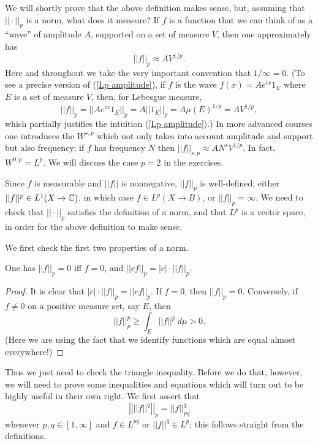 We will shortly prove that the above definition makes sense, but, assuming that $||\cdot||_{p} $ is a norm, what does it measure?
If $f$ is a function that we can think of as a ``wave'' of amplitude $A$, supported on a set of measure $V$, then one approximately has
\begin{equation}
\label{Lp amplitude}
||f||_{p}  \approx AV^{1/p}.
\end{equation}
Here and throughout we take the very important convention that $1/\infty = 0$.
(To see a precise version of (\ref{Lp amplitude}), if $f$ is the wave $f(x) = Ae^{ix}1_E$ where $E$ is a set of measure $V$, then, for Lebesgue measure,
\[||f||_{p}  = ||Ae^{ix}1_E||_{p}  = A ||1_E||_{p}  = A\mu(E)^{1/p} = AV^{1/p},\]
which partially justifies the intuition (\ref{Lp amplitude}).)
In more advanced courses one introduces the  $W^{s,p}$ which not only takes into account amplitude and support but also frequency; if $f$ has frequency $N$ then $||f||_{s,p} \approx AN^sV^{1/p}$.
In fact, $W^{0,p} = L^p$.
We will discuss the case $p = 2$ in the exercises.

Since $f$ is measurable and $||f||$ is nonnegative, $||f||_{p} $ is well-defined; either $||f||^{p} \in L^1(X \to \mathbb{C})$, in which case $f \in L^p(X \to B)$, or $||f||_{p}  = \infty$.
We need to check that $||\cdot||_{p} $ satisfies the definition of a norm, and that $L^p$ is a vector space, in order for the above definition to make sense.

We first check the first two properties of a norm.
\begin{lemma}
One has $||f||_{p}  = 0$ iff $f = 0$, and $||cf||_{p}  = |c|\cdot||f||_{p} $.
\end{lemma}
\begin{proof}
It is clear that $|c|\cdot||f||_{p}  = ||cf||_{p} $.
If $f = 0$, then $||f||_{p}  = 0$.
Conversely, if $f \neq 0$ on a positive measure set, say $E$, then
\[||f||_{p} ^{p} \geq \int_{E} ||f||^{p} ~d\mu > 0.\]
(Here we are using the fact that we identify functions which are equal almost everywhere!)
\end{proof}

Thus we just need to check the triangle inequality. Before we do that, however, we will need to prove some inequalities and equations which will turn out to be highly useful in their own right.
We first assert that
\begin{equation}
\label{pull exponent of Lp}
\left|\left|||f||^q\right|\right|_{p}  = ||f||_{pq}^q
\end{equation}
whenever $p, q \in [1, \infty]$ and $f \in L^{pq}$ or $||f||^{q} \in L^p$; this follows straight from the definitions.

